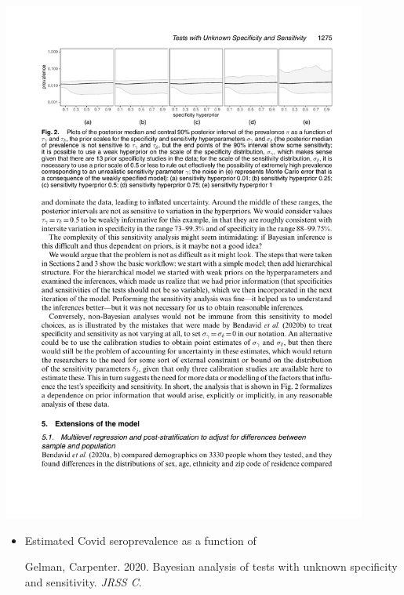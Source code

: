 \documentclass[10pt]{report}
\begin{document}
\begin{center}
\vspace*{-10pt}
\includegraphics[width=0.9\textwidth]{img/covid-sensitivity.pdf}
\vspace*{-10pt}
\end{center}
\begin{itemize}
\item Estimated Covid seroprevalence as a function of
\vfill
{\tiny
Gelman, Carpenter. 2020. Bayesian analysis of tests with unknown
specificity and sensitivity. \textit{JRSS C}.}
\end{itemize}
\end{document}
